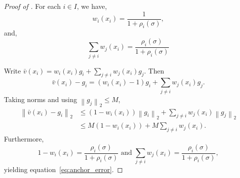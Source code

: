 \documentclass{article} %
\def\eqref#1{equation~\ref{#1}}
\newcommand*{\norm}[1]{\left\|#1\right\|}
\theoremstyle{plain}
\theoremstyle{definition}
\theoremstyle{remark}
\begin{document}
\begin{proof}[Proof of ]

For each $i \in I$, we have,
    \[w_i(x_i) = \frac{1}{1 + \rho_i(\sigma)},\] 
and,
    \[\sum_{j \neq i} w_j(x_i) = \frac{\rho_i(\sigma)}{1 + \rho_i(\sigma)}\]



Write
$\bar v(x_i) = w_i(x_i) g_i + \sum_{j \neq i} w_j(x_i) g_j$.
Then
    \[ \bar v(x_i) - g_i = (w_i(x_i) - 1) g_i + \sum_{j \neq i} w_j(x_i) g_j. \]
Taking norms and using $\norm{g_j}_2 \le M$,
    \begin{align*}
        \norm{\bar v(x_i) - g_i}_2 &\le (1 - w_i(x_i)) \norm{g_i}_2 + \sum_{j \neq i} w_j(x_i) \norm{g_j}_2 \\ &\le M (1 - w_i(x_i)) + M \sum_{j \neq i} w_j(x_i). 
    \end{align*}
Furthermore,
    \[ 1 - w_i(x_i) = \dfrac{\rho_i(\sigma)}{1 + \rho_i(\sigma)} \text{ and } \sum_{j \neq i} w_j(x_i) = \dfrac{\rho_i(\sigma)}{1 + \rho_i(\sigma)}, \]
yielding \eqref{eq:anchor_error}.
\end{proof}
\end{document}
